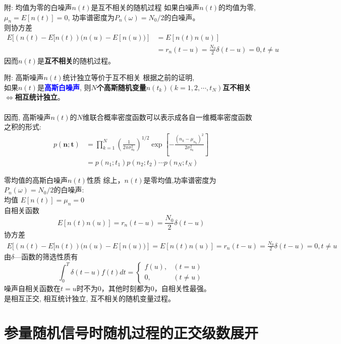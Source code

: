 \begin{frame}[shrink]{附: 均值为零的白噪声$n(t)$是互不相关的随机过程}
如果白噪声$n(t)$的均值为零, $\mu_n=E[n(t)]=0$, 功率谱密度为$P_n(\omega)=N_0/2$的白噪声。\\ 
则协方差
\begin{align*}
	E[(n(t)-E[n(t))(n(u)-E[n(u))]&=E[n(t)n(u)]\\
	&=r_n(t-u)=\frac{N_0}{2}\delta(t-u)=0, t\ne u
\end{align*}
因而$n(t)$是\textbf{互不相关}的随机过程。\\
\end{frame}

\begin{frame}[shrink]{附: 高斯噪声$n(t)$统计独立等价于互不相关}
根据之前的证明,\\
如果$n(t)$是\textbf{\textcolor{blue}{高斯白噪声}}, 则\textbf{$N$个高斯随机变量$n(t_k) (k=1,2,\cdots,t_N)$互不相关$\Leftrightarrow$相互统计独立}。\\
~\\
因而, 高斯噪声$n(t)$的$N$维联合概率密度函数可以表示成各自一维概率密度函数之积的形式:
\begin{align*}
p(\bm{n;t})&=\prod\limits_{k=1}^{N}\left(\frac{1}{2\pi\sigma_{n_k}^2}\right)^{1/2}\exp\left[-\frac{(n_k-\mu_{n_k})^2}{2\sigma_{n_k}^2}\right]\\
&=p(n_1;t_1)p(n_2;t_2)\cdots p(n_N;t_N)
\end{align*}
\end{frame}

\begin{frame}[shrink]{零均值的高斯白噪声$n(t)$性质}
综上，$n(t)$是零均值,功率谱密度为$P_n(\omega)=N_0/2$的白噪声:\\
均值 $E[n(t)]=\mu_n=0$\\
自相关函数 
\[ E[n(t)n(u)]=r_n(t-u)=\frac{N_0}{2}\delta(t-u)\]
协方差
\begin{align*}
E[(n(t)-E[n(t))(n(u)-E[n(u))]=E[n(t)n(u)]=r_n(t-u)=\frac{N_0}{2}\delta(t-u)=0, t\ne u
\end{align*}
由$\delta$---函数的筛选性质有
\[
\int_0^T\delta(t-u)f(t)dt=
\begin{cases}
f(u), & (t=u)\\
0, & (t\ne u) 
\end{cases}
\]
噪声自相关函数在$t=u$时不为0，其他时刻都为0，自相关性最强。\\
是相互正交, 相互统计独立, 互不相关的随机变量过程。
\end{frame}

\section{参量随机信号时随机过程的正交级数展开}

